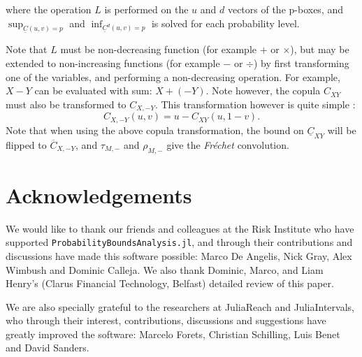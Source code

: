 \documentclass{juliacon}
\begin{document}
where the operation $L$ is performed on the $u$ and $d$ vectors of the p-boxes, and $\sup_{\underline{C}(u,v) = p}$ and $\inf_{\underline{C}^{d}(u,v) = p}$ is solved for each probability level.

Note that $L$ must be non-decreasing function (for example $+$ or $\times$), but may be extended to non-increasing functions (for example $-$ or $\div$) by first transforming one of the variables, and performing a non-decreasing operation. For example, $X - Y$ can be evaluated with sum: $X + (-Y)$. Note however, the copula $C_{XY}$ must also be transformed to $C_{X,-Y}$. This transformation however is quite simple \cite{nelsen2007introduction}: 
\begin{equation*}\label{rotation}
  C_{X, -Y}(u,v) = u - C_{XY}(u, 1 - v).
\end{equation*}
Note that when using the above copula transformation, the bound on $\underline{C}_{XY}$ will be flipped to $\overline{C}_{X, -Y}$, and $\tau_{M, -}$ and $\rho_{M,-}$ give the \textit{Fréchet} convolution.
\fi

\section*{Acknowledgements}
We would like to thank our friends and colleagues at the Risk Institute who have supported \texttt{ProbabilityBoundsAnalysis.jl}, and through their contributions and discussions have made this software possible: Marco De Angelis, Nick Gray, Alex Wimbush and Dominic Calleja. We also thank Dominic, Marco, and Liam Henry's (Clarus Financial Technology, Belfast) detailed review of this paper.

We are also specially grateful to the researchers at JuliaReach and JuliaIntervals, who through their interest, contributions, discussions and suggestions have greatly improved the software: Marcelo Forets, Christian Schilling, Luis Benet and David Sanders.
\end{document}
